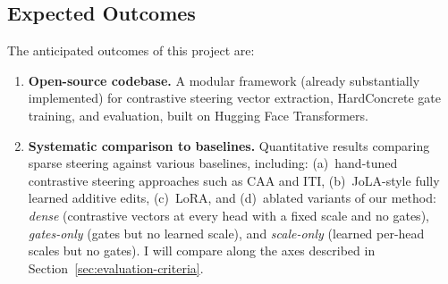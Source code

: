 \subsection{Expected Outcomes}\label{sec:expected-outcomes}

The anticipated outcomes of this project are:

\begin{enumerate}
    \item \textbf{Open-source codebase.} A modular framework (already substantially implemented) for contrastive steering vector extraction, HardConcrete gate training, and evaluation, built on Hugging Face Transformers.

    \item \textbf{Systematic comparison to baselines.} Quantitative results comparing sparse steering against various baselines, including: (a)~hand-tuned contrastive steering approaches such as CAA and ITI, (b)~JoLA-style fully learned additive edits, (c)~LoRA, and (d)~ablated variants of our method: \emph{dense} (contrastive vectors at every head with a fixed scale and no gates), \emph{gates-only} (gates but no learned scale), and \emph{scale-only} (learned per-head scales but no gates). I will compare along the axes described in Section~\ref{sec:evaluation-criteria}.
\end{enumerate}

